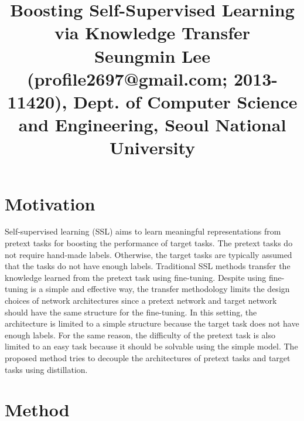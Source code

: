 \documentclass[10pt,twocolumn,letterpaper]{article}
\begin{document}
\title{Boosting Self-Supervised Learning via Knowledge Transfer
	 \\ {\rm {\normalsize Seungmin Lee (profile2697@gmail.com; 2013-11420), Dept. of Computer Science and Engineering, Seoul National University}}} 

\maketitle
\thispagestyle{empty}


\section{Motivation}
\vspace{-0.2cm}
Self-supervised learning (SSL) aims to learn meaningful representations from pretext tasks for boosting the performance of target tasks. The pretext tasks do not require hand-made labels. Otherwise, the target tasks are typically assumed that the tasks do not have enough labels. Traditional SSL methods transfer the knowledge learned from the pretext task using fine-tuning. Despite using fine-tuning is a simple and effective way, the transfer methodology limits the design choices of network architectures since a pretext network and target network should have the same structure for the fine-tuning. In this setting, the architecture is limited to a simple structure because the target task does not have enough labels. For the same reason, the difficulty of the pretext task is also limited to an easy task because it should be solvable using the simple model. The proposed method tries to decouple the architectures of pretext tasks and target tasks using distillation.
 
\vspace{-0.3cm}
\section{Method}
\vspace{-0.2cm}
\end{document}
